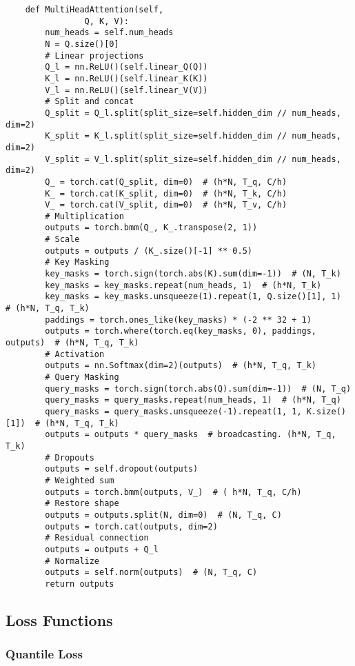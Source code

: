\documentclass{article}
\begin{document}
\begin{lstlisting}
    def MultiHeadAttention(self,
                Q, K, V):
        num_heads = self.num_heads
        N = Q.size()[0]
        # Linear projections
        Q_l = nn.ReLU()(self.linear_Q(Q))
        K_l = nn.ReLU()(self.linear_K(K))
        V_l = nn.ReLU()(self.linear_V(V))
        # Split and concat
        Q_split = Q_l.split(split_size=self.hidden_dim // num_heads, dim=2)
        K_split = K_l.split(split_size=self.hidden_dim // num_heads, dim=2)
        V_split = V_l.split(split_size=self.hidden_dim // num_heads, dim=2)
        Q_ = torch.cat(Q_split, dim=0)  # (h*N, T_q, C/h)
        K_ = torch.cat(K_split, dim=0)  # (h*N, T_k, C/h)
        V_ = torch.cat(V_split, dim=0)  # (h*N, T_v, C/h)
        # Multiplication
        outputs = torch.bmm(Q_, K_.transpose(2, 1))
        # Scale
        outputs = outputs / (K_.size()[-1] ** 0.5)
        # Key Masking
        key_masks = torch.sign(torch.abs(K).sum(dim=-1))  # (N, T_k)
        key_masks = key_masks.repeat(num_heads, 1)  # (h*N, T_k)
        key_masks = key_masks.unsqueeze(1).repeat(1, Q.size()[1], 1)  # (h*N, T_q, T_k)
        paddings = torch.ones_like(key_masks) * (-2 ** 32 + 1)
        outputs = torch.where(torch.eq(key_masks, 0), paddings, outputs)  # (h*N, T_q, T_k)
        # Activation
        outputs = nn.Softmax(dim=2)(outputs)  # (h*N, T_q, T_k)
        # Query Masking
        query_masks = torch.sign(torch.abs(Q).sum(dim=-1))  # (N, T_q)
        query_masks = query_masks.repeat(num_heads, 1)  # (h*N, T_q)
        query_masks = query_masks.unsqueeze(-1).repeat(1, 1, K.size()[1])  # (h*N, T_q, T_k)
        outputs = outputs * query_masks  # broadcasting. (h*N, T_q, T_k)
        # Dropouts
        outputs = self.dropout(outputs)
        # Weighted sum
        outputs = torch.bmm(outputs, V_)  # ( h*N, T_q, C/h)
        # Restore shape
        outputs = outputs.split(N, dim=0)  # (N, T_q, C)
        outputs = torch.cat(outputs, dim=2)
        # Residual connection
        outputs = outputs + Q_l
        # Normalize
        outputs = self.norm(outputs)  # (N, T_q, C)
        return outputs

\end{lstlisting}
\clearpage

\subsection{Loss Functions}

\subsubsection{Quantile Loss}
\end{document}
